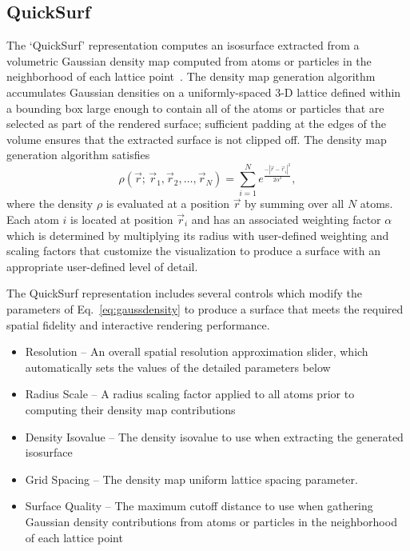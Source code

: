 \subsection{QuickSurf}
\label{ug:topic:drawmethods:quicksurf}
The `QuickSurf' representation computes an isosurface extracted from a 
volumetric Gaussian density map computed from atoms or particles in the
neighborhood of each 
lattice point~\cite{KRON2012,ROBE2012-ZLS,STON2013,STON2013A,CAI2014,STON2014,SENE2014A}.
The density map generation algorithm accumulates Gaussian densities on a
uniformly-spaced 3-D lattice defined within a bounding box
large enough to contain all of the atoms or particles that are selected
as part of the rendered surface; sufficient padding at the edges
of the volume ensures that the extracted surface is not clipped off.
The density map generation algorithm satisfies
\begin{equation}
\rho(\vec{r};\,\vec{r}_1,\vec{r}_2,\dots,\vec{r}_N)
= \sum_{i=1}^{N} e^\frac{-|\vec{r}-\vec{r}_{i}|^2}{2 \alpha^2},
\label{eq:gaussdensity}
\end{equation}
where the density $\rho$ is evaluated at a position $\vec{r}$ by summing
over all $N$ atoms. Each atom $i$ is located at position $\vec{r}_i$ and
has an associated weighting factor $\alpha$ which is determined by
multiplying its radius with user-defined weighting and scaling factors
that customize the visualization to produce a surface with an
appropriate user-defined level of detail.

The QuickSurf representation includes several controls which modify 
the parameters of Eq.~\ref{eq:gaussdensity} to produce a surface that
meets the required spatial fidelity and interactive rendering performance.

\begin{itemize}
\item Resolution -- An overall spatial resolution approximation slider, which
      automatically sets the values of the detailed parameters below
\item Radius Scale -- A radius scaling factor applied to all atoms prior to 
      computing their density map contributions
\item Density Isovalue -- The density isovalue to use when extracting the
      generated isosurface
\item Grid Spacing -- The density map uniform lattice spacing parameter.
\item Surface Quality -- The maximum cutoff distance to use when gathering
      Gaussian density contributions from atoms or particles in the 
      neighborhood of each lattice point
\end{itemize}

